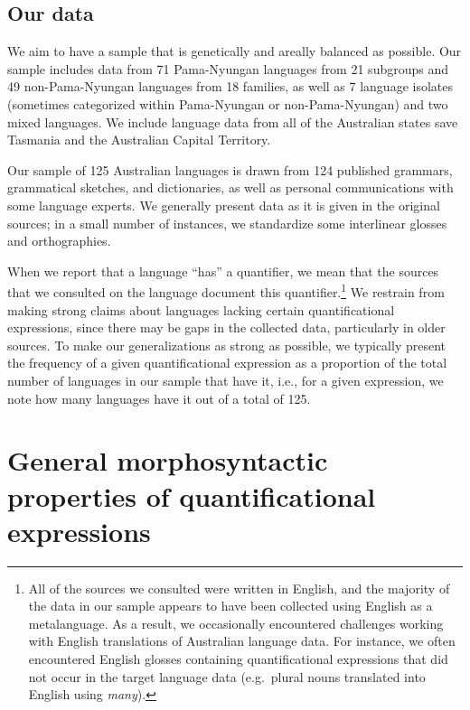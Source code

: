 \documentclass[12pt,egregdoesnotlikesansseriftitles]{scrartcl}
\begin{document}

\subsection{Our data}


We aim to have a sample that is genetically and areally balanced as possible. Our sample includes data from 71 Pama-Nyungan languages from 21 subgroups and 49 non-Pama-Nyungan languages from 18 families, as well as 7 language isolates (sometimes categorized within Pama-Nyungan or non-Pama-Nyungan) and two mixed languages. We include language data from all of the Australian states save Tasmania and the Australian Capital Territory.

Our sample of 125 Australian languages  is drawn from 124 published grammars, grammatical sketches, and dictionaries, as well as personal communications with some language experts.  We generally present data as it is given in the original sources; in a small number of  instances, we standardize some interlinear glosses and orthographies.

When we report that a language ``has'' a quantifier, we mean that the sources that we consulted on the language document this quantifier.\footnote{All of the sources we consulted were written in English, and the majority of the data in our sample appears to have been collected using English as a metalanguage. As a result, we occasionally encountered challenges working with English translations of Australian language data. For instance, we often encountered English glosses containing quantificational expressions that did not occur in the target language data (e.g.\ plural nouns translated into English using \textit{many}).} We restrain from making strong claims about languages lacking certain quantificational
expressions, since there may be gaps in the collected data, particularly in older sources. To make our generalizations as strong as possible, we typically present the frequency of a given quantificational expression as a proportion of the total number of languages in our sample that have it, i.e., for a given expression, we note how many languages have it out of a total of 125.

\section{General morphosyntactic properties of  quantificational expressions}
\end{document}
